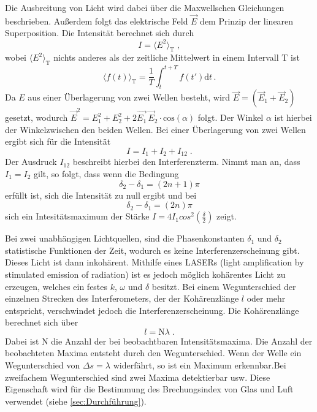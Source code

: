 Die Ausbreitung von Licht wird dabei über die Maxwellschen Gleichungen beschrieben. Außerdem folgt das elektrische Feld 
$\vec{E}$ dem Prinzip der linearen Superposition.
Die Intensität berechnet sich durch 
\begin{equation*}
    I = \langle E^2\rangle _{\text{T}} \; ,
\end{equation*}
wobei $\langle E^2\rangle _{\text{T}}$ nichts anderes als der zeitliche Mittelwert in einem Intervall T ist
\begin{equation}
    \langle f(t) \rangle _{\text{T}} = \frac{1}{T}\int_t^{t+T} f(t')\text{d}t \, .
    \label{eqn:zeitlichMittel}
\end{equation}
Da $E$ aus einer Überlagerung von zwei Wellen besteht, wird $\vec{E}=(\vec{E}_1+\vec{E}_2)$ gesetzt, wodurch $\vec{E}^2= E_1^2+E_2^2+2\vec{E_1}\, \vec{E}_2\cdot\text{cos}(\alpha)$ folgt.
Der Winkel $\alpha$ ist hierbei der Winkelzwischen den beiden Wellen.
Bei einer Überlagerung von zwei Wellen ergibt sich für die Intensität 
\begin{equation*}
    I = I_1 +I_2 +I_{12}\; .
\end{equation*}
Der Ausdruck $I_{12}$ beschreibt hierbei den Interferenzterm.
Nimmt man an, dass $I_1=I_2$ gilt, so folgt, dass
wenn die Bedingung
\begin{equation*}
    \delta_2 -\delta_1 = \left(2n+1\right)\pi 
\end{equation*}
erfüllt ist, sich die Intensität zu null ergibt und
bei 
\begin{equation*}
    \delta_2 -\delta_1 = \left(2n\right)\pi 
\end{equation*}
sich ein Intesitätsmaximum der Stärke $I=4I_1cos^2{\left(\frac{\delta}{2}\right)}$ zeigt.

Bei zwei unabhängigen Lichtquellen, sind die Phasenkonstanten $\delta_1$ und $\delta_2$ statistische Funktionen der Zeit, wodurch es keine 
Interferenzerscheinung gibt. Dieses Licht ist dann inkohärent. Mithilfe eines LASERs (light amplification by stimulated emission of radiation)
ist es jedoch möglich kohärentes Licht zu erzeugen, welches ein festes $k$, $\omega$ und $\delta$ besitzt.
Bei einem Wegunterschied der einzelnen Strecken des Interferometers, der der Kohärenzlänge $l$ oder mehr entspricht, verschwindet jedoch die 
Interferenzerscheinung. Die Kohärenzlänge berechnet sich über
\begin{equation*}
    l = \text{N}\lambda \; .
\end{equation*}
Dabei ist N die Anzahl der bei beobachtbaren Intensitätsmaxima. Die Anzahl der beobachteten Maxima entsteht durch den Wegunterschied. Wenn der Welle ein Wegunterschied von $\Delta s=\lambda$ widerfährt, so ist ein Maximum erkennbar.Bei zweifachem Wegunterschied sind zwei Maxima detektierbar usw.
Diese Eigenschaft wird für die Bestimmung des Brechungsindex von Glas und Luft verwendet (siehe \autoref{sec:Durchführung}).

